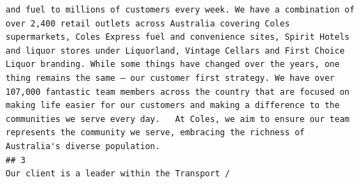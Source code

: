 \documentclass[11pt,a4paper,]{article}
\begin{document}
\begin{verbatim}
and fuel to millions of customers every week. We have a combination of over 2,400 retail outlets across Australia covering Coles supermarkets, Coles Express fuel and convenience sites, Spirit Hotels and liquor stores under Liquorland, Vintage Cellars and First Choice Liquor branding. While some things have changed over the years, one thing remains the same – our customer first strategy. We have over 107,000 fantastic team members across the country that are focused on making life easier for our customers and making a difference to the communities we serve every day.   At Coles, we aim to ensure our team represents the community we serve, embracing the richness of Australia's diverse population.  
## 3                                                                                                                                                                                                                                                                                                                                                                                                                                                                                                                                                                                                                                                                                                                                                                                                                                                                                                                                                                                                                                                                                                                                                                                                                                                                                                                                                                                                                                                                                                                                                                                                                                                                                                                                                                                                                                                                                                                                                                                                                                                                                                                                                                                                                                                                                                                                                                                                                                                                                                                                                                                                                                                        Our client is a leader within the Transport / 
\end{verbatim}
\end{document}
